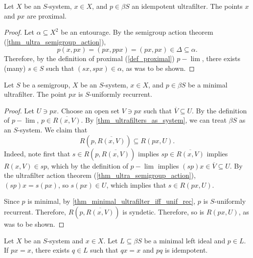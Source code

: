 \begin{lemma}
    \label{lemma_idempotent_implies_proximal}
    \leanok{}
    Let $X$ be an $S$-system, $x \in X$, and $p \in \beta S$ an idempotent ultrafilter.  The points $x$ and $px$ are proximal.
\end{lemma}

\begin{proof}
    \leanok{}
    Let $\alpha \subseteq X^2$ be an entourage.  By the semigroup action theorem (\cref{thm_ultra_semigroup_action}), 
    \[p(x,px) = (px,ppx) = (px,px) \in \Delta \subseteq \alpha.\]
    Therefore, by the definition of proximal (\cref{def_proximal}) $p-\lim$, there exists (many) $s \in S$ such that $(sx,spx) \in \alpha$, as was to be shown.
\end{proof}

\begin{lemma}
    \label{lemma_minimal_implies_uniformly_recurrent}
    \leanok{}
    Let $S$ be a semigroup, $X$ be an $S$-system, $x \in X$, and $p \in \beta S$ be a minimal ultrafilter.  The point $px$ is $S$-uniformly recurrent.
\end{lemma}

\begin{proof}
\leanok{}
    Let $U \ni px$.  Choose an open set $V \ni px$ such that $\overline{V} \subseteq U$.  By the definition of $p-\lim$, $p \in \overline{R(x,V)}$.  By \cref{thm_ultrafilters_as_system}, we can treat $\beta S$ as an $S$-system. We claim that
    \[R(p,\overline{R(x,V)}) \subseteq R(px,U).\]
    Indeed, note first that $s \in R(p,\overline{R(x,V)})$ implies $sp \in \overline{R(x,V)}$ implies $R(x,V) \in sp$, which by the definition of $p-\lim$ implies $(sp)x \in \overline{V} \subseteq U$.  By the ultrafilter action theorem (\cref{thm_ultra_semigroup_action}), $(sp)x = s (px)$, so $s(px) \in U$, which implies that $s \in R(px,U)$.

    Since $p$ is minimal, by \cref{thm_minimal_ultrafilter_iff_unif_rec}, $p$ is $S$-uniformly recurrent.  Therefore, $R(p,\overline{R(x,V)})$ is syndetic. Therefore, so is $R(px,U)$, as was to be shown.
\end{proof}

\begin{lemma}
\label{lemma_ultrafilter_idempotent_lift}
\leanok{}
    Let $X$ be an $S$-system and $x \in X$.  Let $L \subseteq \beta S$ be a minimal left ideal and $p \in L$.  If $p x = x$, there exists $q \in L$ such that $q x = x$ and $pq$ is idempotent.
\end{lemma}

